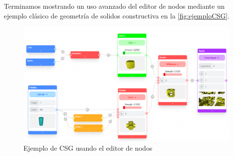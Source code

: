 Terminamos mostrando un uso avanzado del editor de nodos mediante un ejemplo clásico de geometría de solidos constructiva  en la \autoref{fig:ejemploCSG}.
\begin{figure}[ht!]
    \centering
    \includegraphics[width=\textwidth]{Plantilla-TFG-master/img/ejemploCSG.png}
    \caption{Ejemplo de CSG usando el editor de nodos}
    \label{fig:ejemploCSG}
\end{figure}


